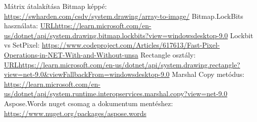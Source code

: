 \documentclass[]{thesis-ekf}
\theoremstyle{definition}
\theoremstyle{remark}
\begin{document}
\begin{thebibliography}{9}
 Mátrix átalakítása Bitmap képpé: \url{https://swharden.com/csdv/system.drawing/array-to-image/}
 Bitmap.LockBits használata: \url{URLhttps://learn.microsoft.com/en-us/dotnet/api/system.drawing.bitmap.lockbits?view=windowsdesktop-9.0}
 Lockbit vs SetPixel: \url{https://www.codeproject.com/Articles/617613/Fast-Pixel-Operations-in-NET-With-and-Without-unsa}
 Rectangle osztály: \url{URLhttps://learn.microsoft.com/en-us/dotnet/api/system.drawing.rectangle?view=net-9.0&viewFallbackFrom=windowsdesktop-9.0}
 Marshal Copy metódus: \url{https://learn.microsoft.com/en-us/dotnet/api/system.runtime.interopservices.marshal.copy?view=net-9.0}
 Aspose.Words nuget csomag a dokumentum mentéshez:  \url{https://www.nuget.org/packages/aspose.words}
\end{thebibliography}


\end{document}
